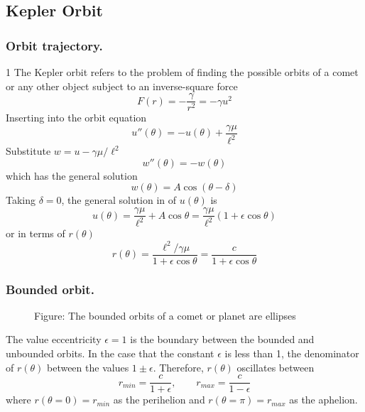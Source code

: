 \documentclass[../../../main.tex]{subfiles}
\begin{document}
\subsection{Kepler Orbit}
\subsubsection{Orbit trajectory.}1
The Kepler orbit refers to the problem of finding the possible orbits of a comet or any other object subject to an inverse-square force
\begin{equation*}
    F(r)=-\frac{\gamma }{r^2}=-\gamma u^2
\end{equation*}
Inserting into the orbit equation
\begin{equation*}
    u''(\theta)=-u(\theta)+\frac{\gamma \mu}{\ell^2}
\end{equation*}
Substitute $w=u-\gamma\mu/\ell^2$
\begin{equation*}
    w''(\theta)=-w(\theta)
\end{equation*}
which has the general solution
\begin{equation*}
    w(\theta)=A \cos (\theta-\delta)
\end{equation*}
Taking $\delta=0$, the general solution in of $u(\theta)$ is 
\begin{equation*}
    u(\theta)=\frac{\gamma\mu }{\ell^2 }+A\cos \theta=\frac{\gamma\mu }{\ell^2}\left( 1+\epsilon \cos \theta \right) 
\end{equation*}
or in terms of $r(\theta)$
\begin{equation*}
    r(\theta)=\frac{\ell^2 /\gamma\mu }{1+\epsilon \cos \theta}=\frac{c }{1+\epsilon \cos \theta}
\end{equation*}

\subsubsection{Bounded orbit.}
\begin{figure*}
    \centering
    \caption*{Figure: The bounded orbits of a comet or planet are ellipses}
\end{figure*}
The value eccentricity $\epsilon = 1$ is the boundary between the bounded and unbounded orbits. 
In the case that the constant $\epsilon$ is less than 1, the denominator of $r(\theta)$  between the values $1 \pm \epsilon$. 
Therefore, $r(\theta)$ oscillates between
\begin{equation*}
    r_{min}=\frac{c}{1+\epsilon},\qquad
    r_{max}=\frac{c}{1-\epsilon}
\end{equation*}
where $r(\theta=0)=r_{min}$ as the perihelion and $r(\theta=\pi)=r_{max}$ as the aphelion.
\end{document}
